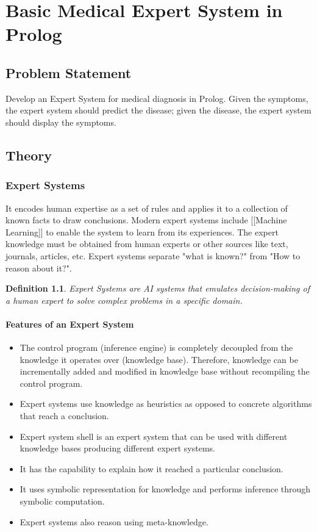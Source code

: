 \documentclass[12pt,a4paper]{report}
\newtheorem{definition}{Definition}
\begin{document}
\chapter{Basic Medical Expert System in Prolog}
\section{Problem Statement}
Develop an Expert System for medical diagnosis in Prolog. Given the symptoms, the expert system
should predict the disease; given the disease, the expert system should display the symptoms.

\section{Theory}
\subsection{Expert Systems}
It encodes human expertise as a set of rules and applies it to a collection of known facts to draw conclusions.
Modern expert systems include [[Machine Learning]] to enable the system to learn from its experiences.
The expert knowledge must be obtained from human experts or other sources like text, journals, articles, etc.
Expert systems separate "what is known?" from "How to reason about it?".

\begin{definition}
Expert Systems are AI systems that emulates decision-making of a human expert to solve complex problems in a specific domain.
\end{definition}

\subsubsection{Features of an Expert System}
\begin{itemize}
\item The control program (inference engine) is completely decoupled from the knowledge it operates over (knowledge base). Therefore, knowledge can be incrementally added and modified in knowledge base without recompiling the control program.
\item Expert systems use knowledge as heuristics as opposed to concrete algorithms that reach a conclusion.
\item Expert system shell is an expert system that can be used with different knowledge bases producing different expert systems.
\item It has the capability to explain how it reached a particular conclusion.
\item It uses symbolic representation for knowledge and performs inference through symbolic computation.
\item Expert systems also reason using meta-knowledge.
\end{itemize}
\end{document}
